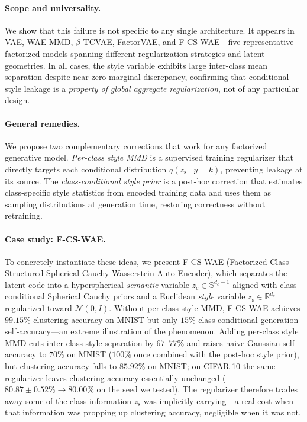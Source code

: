 \documentclass[10pt]{article}
\newcommand{\ours}{F-CS-WAE}
\newcommand{\zc}{z_{\mathrm{c}}}
\newcommand{\zs}{z_{\mathrm{s}}}
\newcommand{\Sph}{\mathbb{S}}
\newcommand{\R}{\mathbb{R}}
\begin{document}
\paragraph{Scope and universality.}
We show that this failure is not specific to any single architecture.
It appears in VAE, WAE-MMD, $\beta$-TCVAE, FactorVAE, and F-CS-WAE---five
representative factorized models spanning different regularization strategies and
latent geometries.
In all cases, the style variable exhibits large inter-class mean separation despite
near-zero marginal discrepancy, confirming that conditional style leakage is a
\emph{property of global aggregate regularization}, not of any particular design.

\paragraph{General remedies.}
We propose two complementary corrections that work for any factorized generative model.
\emph{Per-class style MMD} is a supervised training regularizer that directly targets
each conditional distribution $q(\zs\mid y{=}k)$, preventing leakage at its source.
The \emph{class-conditional style prior} is a post-hoc correction that estimates
class-specific style statistics from encoded training data and uses them as sampling
distributions at generation time, restoring correctness without retraining.

\paragraph{Case study: F-CS-WAE.}
To concretely instantiate these ideas, we present \ours{} (Factorized Class-Structured
Spherical Cauchy Wasserstein Auto-Encoder), which separates the latent code into a
hyperspherical \emph{semantic} variable $\zc\in\Sph^{d_c-1}$ aligned with
class-conditional Spherical Cauchy priors and a Euclidean \emph{style} variable
$\zs\in\R^{d_s}$ regularized toward $\mathcal{N}(0,I)$.
Without per-class style MMD, F-CS-WAE achieves $99.15\%$ clustering accuracy on MNIST
but only $15\%$ class-conditional generation self-accuracy---an extreme illustration
of the phenomenon.
Adding per-class style MMD cuts inter-class style separation by $67$--$77\%$ and
raises naive-Gaussian self-accuracy to $70\%$ on MNIST ($100\%$ once combined with
the post-hoc style prior), but clustering accuracy falls to $85.92\%$ on MNIST;
on CIFAR-10 the same regularizer leaves clustering accuracy essentially unchanged
($80.87\pm0.52\%\to80.00\%$ on the seed we tested).
The regularizer therefore trades away some of the class information $\zs$ was
implicitly carrying---a real cost when that information was propping up clustering
accuracy, negligible when it was not.
\end{document}
